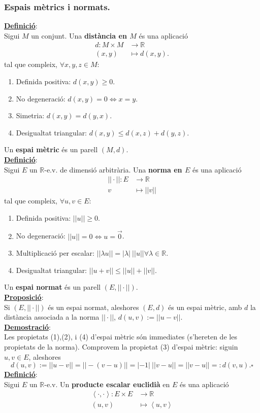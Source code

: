 \documentclass[11pt]{article}
\newcommand{\kev}[1]{$\mathbb{#1}$-e.v.}
\newcommand{\undbf}[1]{\underline{\textbf{#1}}:\\}
\newcommand{\defi}{\undbf{Definició}}
\newcommand{\prop}{\undbf{Proposició}}
\newcommand{\dem}{\undbf{Demostració}}
\newcommand{\dotpr}[2]{\left< #1,#2\right>}
\newcommand{\norm}[1]{||#1||}
\begin{document}
\subsubsection{Espais mètrics i normats.}
\defi Sigui $M$ un conjunt. Una \textbf{distància en $M$} és una aplicació
\begin{align*}
		d \colon M\times M &\to \mathbb{R}\\
		(x,y) &\mapsto d(x,y).
\end{align*}
tal que compleix, $\forall x,y,z\in M$:
\begin{enumerate}
	\item Definida positiva: $d(x,y)\geq0$.
	\item No degeneració: $d(x,y)=0\iff x=y$.
	\item Simetria: $d(x,y)=d(y,x)$.
	\item Desigualtat triangular: $d(x,y)\leq d(x,z)+d(y,z)$.
\end{enumerate}
Un \textbf{espai mètric} és un parell $(M,d)$.\\
\defi Sigui $E$ un \kev{R} de dimensió arbitrària. Una \textbf{norma en $E$} és una aplicació
\begin{align*}
		\norm{\cdot} \colon E &\to \mathbb{R}\\
		v &\mapsto \norm{v}
\end{align*}
tal que compleix, $\forall u,v\in E$:
\begin{enumerate}
	\item Definida positiva: $\norm{u}\geq0$.
	\item No degeneració: $\norm{u}=0\iff u=\vec{0}$.
	\item Multiplicació per escalar: $\norm{\lambda u}=|\lambda|\ \norm{u}\forall\lambda\in\mathbb{R}$.
	\item Desigualtat triangular: $\norm{u+v}\leq \norm{u}+\norm{v}$.
\end{enumerate}
Un \textbf{espai normat} és un parell $(E,\norm{\cdot})$.\\
\prop Si $(E,\norm{\cdot})$ és un espai normat, aleshores $(E,d)$ és un espai mètric, amb $d$ la distància associada a la norma $\norm{\cdot}$, $d(u,v):=\norm{u-v}$.\\
\dem Les propietats (1),(2), i (4) d'espai mètric són immediates (s'hereten de les propietats de la norma). Comprovem la propietat (3) d'espai mètric: siguin $u,v\in E$, aleshores
$$
d(u,v):=||u-v||=||-(v-u)||=|-1|\ ||v-u||=||v-u||=:d(v,u).\square
$$
\defi Sigui $E$ un \kev{R} Un \textbf{producte escalar euclidià} en $E$ és una aplicació
\begin{align*}
		\dotpr{\cdot}{\cdot} \colon E\times E &\to \mathbb{R}\\
		(u,v) &\mapsto \dotpr{u}{v}
\end{align*}
\end{document}
